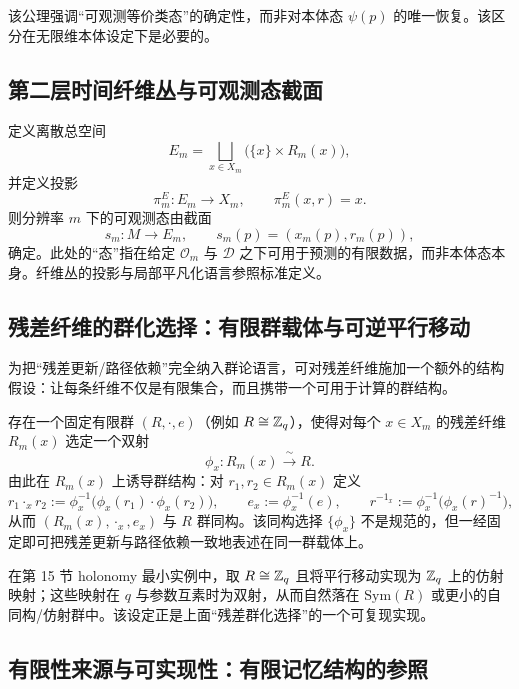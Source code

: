 该公理强调“可观测等价类态”的确定性，而非对本体态 $\psi(p)$ 的唯一恢复。该区分在无限维本体设定下是必要的。

\subsection{第二层时间纤维丛与可观测态截面}

定义离散总空间
$$
E_m=\bigsqcup_{x\in X_m}\bigl(\{x\}\times R_m(x)\bigr),
$$
并定义投影
$$
\pi_m^{E}:E_m\to X_m,\qquad \pi_m^{E}(x,r)=x.
$$
则分辨率 $m$ 下的可观测态由截面
$$
s_m:M\to E_m,\qquad s_m(p)=(x_m(p),r_m(p)),
$$
确定。此处的“态”指在给定 $\mathcal O_m$ 与 $\mathcal D$ 之下可用于预测的有限数据，而非本体态本身。纤维丛的投影与局部平凡化语言参照标准定义。\cite{cohen_fiber_bundles}

\subsection{残差纤维的群化选择：有限群载体与可逆平行移动}

为把“残差更新/路径依赖”完全纳入群论语言，可对残差纤维施加一个额外的结构假设：让每条纤维不仅是有限集合，而且携带一个可用于计算的群结构。

\begin{assumption}[有限群残差载体（可选）]\label{ass:finite_group_residual_carrier}
存在一个固定有限群 $(R,\cdot,e)$（例如 $R\cong \mathbb{Z}_q$），使得对每个 $x\in X_m$ 的残差纤维 $R_m(x)$ 选定一个双射
$$
\phi_x:R_m(x)\xrightarrow{\ \sim\ }R.
$$
由此在 $R_m(x)$ 上诱导群结构：对 $r_1,r_2\in R_m(x)$ 定义
$$
r_1\cdot_x r_2:=\phi_x^{-1}\bigl(\phi_x(r_1)\cdot \phi_x(r_2)\bigr),
\qquad
e_x:=\phi_x^{-1}(e),
\qquad
r^{-1_x}:=\phi_x^{-1}\bigl(\phi_x(r)^{-1}\bigr),
$$
从而 $(R_m(x),\cdot_x,e_x)$ 与 $R$ 群同构。该同构选择 $\{\phi_x\}$ 不是规范的，但一经固定即可把残差更新与路径依赖一致地表述在同一群载体上。
\end{assumption}

\begin{remark}[与第 15 节玩具连接的对应]
在第 15 节 holonomy 最小实例中，取 $R\cong \mathbb{Z}_q$ 且将平行移动实现为 $\mathbb{Z}_q$ 上的仿射映射；这些映射在 $q$ 与参数互素时为双射，从而自然落在 $\mathrm{Sym}(R)$ 或更小的自同构/仿射群中。该设定正是上面“残差群化选择”的一个可复现实现。
\end{remark}

\subsection{有限性来源与可实现性：有限记忆结构的参照}

